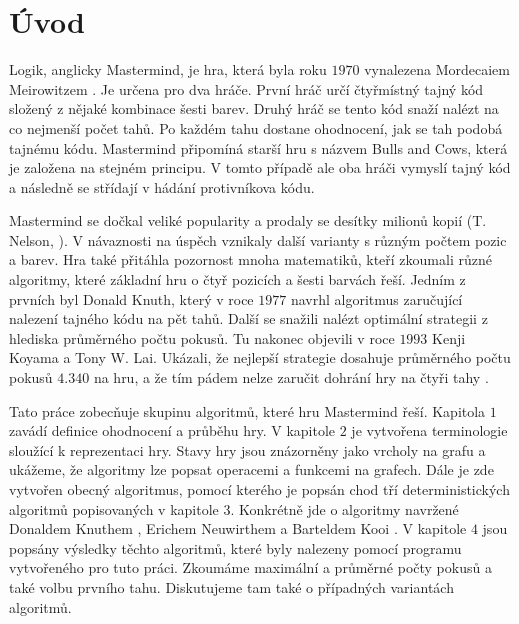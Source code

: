 \chapter*{Úvod}

Logik, anglicky Mastermind, je hra, která byla roku $1970$ vynalezena Mordecaiem Meirowitzem \cite{Nelson-history}. Je určena pro dva hráče. První hráč určí čtyřmístný tajný kód složený z nějaké kombinace šesti barev. Druhý hráč se tento kód snaží nalézt na co nejmenší počet tahů. Po každém tahu dostane ohodnocení, jak se tah podobá tajnému kódu. Mastermind připomíná starší hru s názvem Bulls and Cows, která je založena na stejném principu. V tomto případě ale oba hráči vymyslí tajný kód a následně se střídají v hádání protivníkova kódu. 

Mastermind se dočkal veliké popularity a prodaly se desítky milionů kopií (T. Nelson, \cite{Nelson-history}). V návaznosti na úspěch vznikaly další varianty s různým počtem pozic a barev. Hra také přitáhla pozornost mnoha matematiků, kteří zkoumali různé algoritmy, které základní hru o čtyř pozicích a šesti barvách řeší. Jedním z prvních byl Donald Knuth, který v roce $1977$ navrhl algoritmus zaručující nalezení tajného kódu na pět tahů\cite{donald_e__knuth_1977}. Další se snažili nalézt optimální strategii z hlediska průměrného počtu pokusů. Tu nakonec objevili v roce $1993$ Kenji Koyama a Tony W. Lai. Ukázali, že nejlepší strategie dosahuje průměrného počtu pokusů $4.340$ na hru, a že tím pádem nelze zaručit dohrání hry na čtyři tahy \cite{koyama}. 



Tato práce zobecňuje skupinu algoritmů, které hru Mastermind řeší. Kapitola $1$ zavádí definice ohodnocení a průběhu hry. V kapitole $2$ je vytvořena terminologie sloužící k reprezentaci hry. Stavy hry jsou znázorněny jako vrcholy na grafu a ukážeme, že algoritmy lze popsat operacemi a funkcemi na grafech. Dále je zde vytvořen obecný algoritmus, pomocí kterého je popsán chod tří deterministických algoritmů popisovaných v kapitole $3$. Konkrétně jde o algoritmy navržené Donaldem Knuthem \cite{donald_e__knuth_1977}, Erichem Neuwirthem \cite{neuwirth} a Barteldem Kooi \cite{kooi}. V kapitole $4$ jsou popsány výsledky těchto algoritmů, které byly nalezeny pomocí programu vytvořeného pro tuto práci. Zkoumáme maximální a průměrné počty pokusů a také volbu prvního tahu. Diskutujeme tam také o případných variantách algoritmů. 